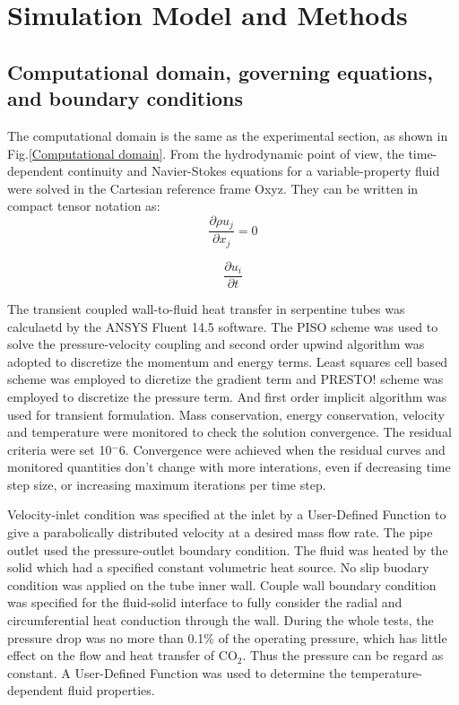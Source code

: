 \documentclass[a4paper,12pt]{article}
\begin{document}
\section{Simulation Model and Methods}

\subsection{Computational domain, governing equations, and boundary conditions}
The computational domain is the same as the experimental section, as shown in Fig.\ref{Computational domain}.  From the hydrodynamic point of view, the time-dependent continuity and Navier-Stokes equations for a variable-property fluid were solved in the Cartesian reference frame Oxyz. They can be written  in compact tensor notation as:
\begin{equation}
\frac{\partial \rho u_j}{\partial x_j}=0
\end{equation}

\begin{equation}
\frac{\partial u_i}{\partial t}
\end{equation}

The transient coupled wall-to-fluid heat transfer in serpentine tubes was calculaetd by the ANSYS Fluent 14.5 software. The PISO scheme was used to solve the pressure-velocity coupling and second order upwind algorithm was adopted to discretize the momentum and energy terms. Least squares cell based scheme was employed to dicretize the gradient term and PRESTO! scheme was employed to discretize the  pressure term. And first order implicit algorithm was used for transient formulation. Mass conservation, energy conservation, velocity and temperature were monitored to check the solution convergence. The residual criteria were set 10$^-6$. Convergence were achieved when the residual curves and monitored quantities don't change with more interations, even if decreasing time step size, or increasing maximum iterations per time step.

Velocity-inlet condition was specified at the inlet by a User-Defined Function to give a parabolically distributed velocity at a desired mass flow rate. The pipe outlet used the pressure-outlet boundary condition. The fluid was heated by the solid which had a specified constant volumetric heat source. No slip buodary condition was applied on the tube inner wall. Couple wall boundary condition was specified for the fluid-solid interface to fully consider the radial and circumferential heat conduction through the wall. During the whole tests, the pressure drop was no more than 0.1\% of the operating pressure, which has little effect on the flow and heat transfer of CO$_2$. Thus the pressure can be regard as constant. A User-Defined Function was used to determine the temperature-dependent fluid properties.
\end{document}
